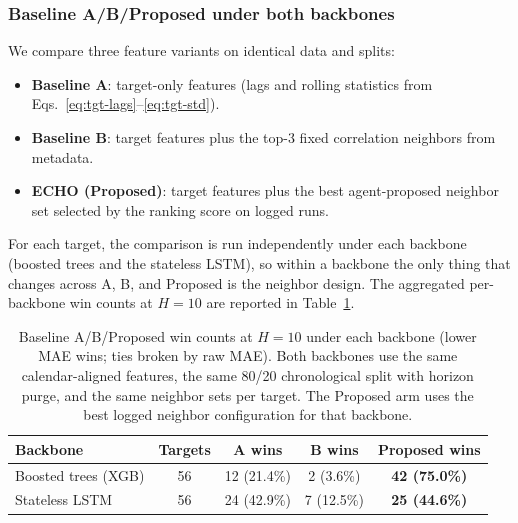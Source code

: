\documentclass[12pt,a4paper,titlepage]{article}
\begin{document}
\subsubsection{Baseline A/B/Proposed under both backbones}
\label{sec:baseline-abc}

We compare three feature variants on identical data and splits:
\begin{itemize}
    \item \textbf{Baseline A}: target-only features (lags and rolling statistics from Eqs.~\ref{eq:tgt-lags}--\ref{eq:tgt-std}).
    \item \textbf{Baseline B}: target features plus the top-3 fixed correlation neighbors from metadata.
    \item \textbf{ECHO (Proposed)}: target features plus the best agent-proposed neighbor set selected by the ranking score on logged runs.
\end{itemize}
For each target, the comparison is run independently under each backbone (boosted trees and the stateless LSTM), so within a backbone the only thing that changes across A, B, and Proposed is the neighbor design. The aggregated per-backbone win counts at \(H=10\) are reported in Table~\ref{tab:baseline-abc-by-backbone}.

\begin{table}[htbp]
\centering
\small
\caption{Baseline A/B/Proposed win counts at \(H=10\) under each backbone (lower MAE wins; ties broken by raw MAE). Both backbones use the same calendar-aligned features, the same 80/20 chronological split with horizon purge, and the same neighbor sets per target. The Proposed arm uses the best logged neighbor configuration for that backbone.}
\label{tab:baseline-abc-by-backbone}
\begin{tabular}{lcccc}
\toprule
Backbone & Targets & A wins & B wins & Proposed wins \\
\midrule
Boosted trees (XGB) & 56 & 12 (21.4\%) & 2 (3.6\%) & \textbf{42 (75.0\%)} \\
Stateless LSTM      & 56 & 24 (42.9\%) & 7 (12.5\%) & \textbf{25 (44.6\%)} \\
\bottomrule
\end{tabular}
\end{table}
\end{document}
